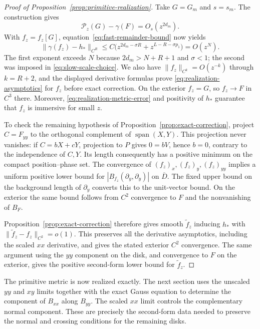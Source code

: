 \begin{proof}[Proof of Proposition~\ref{prop:primitive-realization}]
Take $G=G_m$ and $s=s_m$.  The construction gives
\[
 \mathcal P_z(G)-\gamma(F)=O_s(z^{2d_m}).
\]
With $f_z=f_z[G]$, equation~\eqref{eq:fast-remainder-bound} now yields
\begin{equation}
 \|\gamma(f_z)-h_*\|_{C^R}
   \le C\bigl(z^{2d_m-\sigma R}
                    +z^{L-R-\sigma p_1}\bigr)=O(z^N).
 \label{eq:realization-metric-error}
\end{equation}
The first exponent exceeds $N$ because $2d_m>N+R+1$ and $\sigma<1$;
the second was imposed in \eqref{eq:slow-scale-choice}.  We also have
$\|f_z\|_{C^k}=O(z^{-k})$ through $k=R+2$, and the displayed derivative
formulas prove \eqref{eq:realization-asymptotics} for $f_z$ before exact
correction.  On the exterior $f_z=G$, so $f_z\to F$ in $C^3$ there.
Moreover, \eqref{eq:realization-metric-error} and positivity of $h_*$
guarantee that $f_z$ is immersive for small $z$.

To check the remaining hypothesis of
Proposition~\ref{prop:exact-correction}, project $C=F_{yy}$ to the
orthogonal complement of $\operatorname{span}(X,Y)$.  This projection
never vanishes: if $C=bX+cY$, projection to $P$ gives $0=bV$, hence
$b=0$, contrary to the independence of $C,Y$.  Its length consequently
has a positive minimum on the compact position--phase set.  The
convergence of $(f_z)_x,(f_z)_y,(f_z)_{yy}$ implies a uniform positive
lower bound for $|B_{f_z}(\partial_y,\partial_y)|$ on $\overline D$.
The fixed upper bound on the background length of $\partial_y$ converts
this to the unit-vector bound.  On the exterior the same bound follows
from $C^2$ convergence to $F$ and the nonvanishing of $B_F$.

Proposition~\ref{prop:exact-correction} therefore gives smooth
$\widetilde f_z$ inducing $h_*$ with
$\|\widetilde f_z-f_z\|_{C^2}=o(1)$.  This preserves all the derivative
asymptotics, including the scaled $xx$ derivative, and gives the stated
exterior $C^2$ convergence.  The same argument using the $yy$ component
on the disk, and convergence to $F$ on the exterior, gives the positive
second-form lower bound for $\widetilde f_z$.
\end{proof}

The primitive metric is now realized exactly.  The next section uses the
unscaled $yy$ and $xy$ limits together with the exact Gauss equation to
determine the component of $B_{xx}$ along $B_{yy}$.  The scaled $xx$ limit
controls the complementary normal component.  These are precisely the
second-form data needed to preserve the normal and crossing conditions
for the remaining disks.
